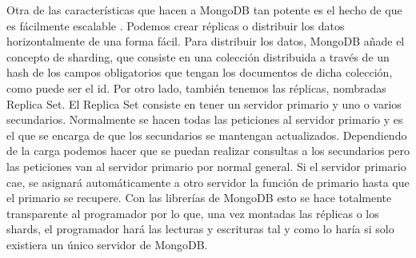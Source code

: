 Otra de las características que hacen a MongoDB tan potente es el hecho de que es fácilmente escalable \cite{Mng-1}. Podemos crear réplicas o distribuir los datos horizontalmente de una forma fácil. Para distribuir los datos, MongoDB añade el concepto de sharding, que consiste en una colección distribuida a través de un hash de los campos obligatorios que tengan los documentos de dicha colección, como puede ser el id. Por otro lado, también tenemos las réplicas, nombradas Replica Set. El Replica Set consiste en tener un servidor primario y uno o varios secundarios. Normalmente se hacen todas las peticiones al servidor primario y es el que se encarga de que los secundarios se mantengan actualizados. Dependiendo de la carga podemos hacer que se puedan realizar consultas a los secundarios pero las peticiones van al servidor primario por normal general. Si el servidor primario cae, se asignará automáticamente a otro servidor la función de primario hasta que el primario se recupere. Con las librerías de MongoDB esto se hace totalmente transparente al programador por lo que, una vez montadas las réplicas o los shards, el programador hará las lecturas y escrituras tal y como lo haría si solo existiera un único servidor de MongoDB.

